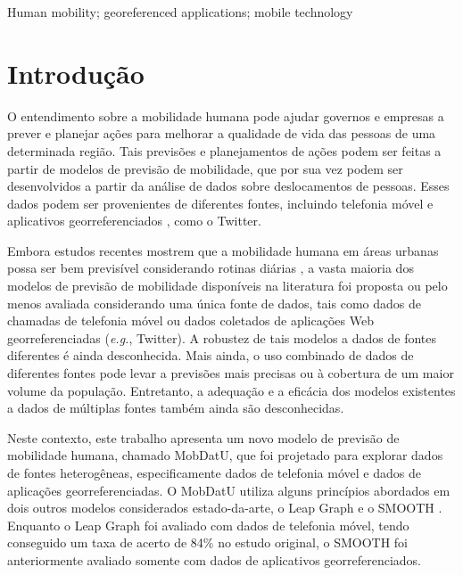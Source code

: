 \documentclass[10pt, a4paper, onecolumn, conference, compsocconf]{IEEEtran}
\begin{document}
\begin{IEEEkeywords}
Human mobility; georeferenced applications; mobile technology
\end{IEEEkeywords}


%
\IEEEpeerreviewmaketitle


\section{Introdução}

O entendimento sobre a mobilidade humana pode ajudar governos e empresas a prever e planejar ações  para melhorar a qualidade de vida das pessoas de uma determinada região. Tais previsões e planejamentos de ações podem ser feitas a partir de modelos de previsão de mobilidade, que por sua vez podem ser desenvolvidos a partir da análise de dados sobre deslocamentos de pessoas. Esses dados podem ser provenientes de diferentes fontes, incluindo telefonia móvel \cite{barabasi2008} e aplicativos georreferenciados \cite{noulas2011}, como o Twitter.

Embora estudos recentes mostrem que a mobilidade humana em áreas urbanas possa ser bem previsível considerando rotinas diárias \cite{barabasi201002}, a vasta maioria dos modelos de previsão de mobilidade disponíveis na literatura \cite{Munjal2011, Dong2013, Kyunghan2012,allamanis2012} foi proposta ou pelo menos avaliada considerando uma única fonte de dados, tais como dados de chamadas de telefonia móvel ou dados coletados de aplicações Web georreferenciadas (\textit{e.g.}, Twitter). A robustez de tais modelos a dados de fontes diferentes é ainda desconhecida.   Mais ainda, o uso combinado de dados de diferentes fontes pode levar a previsões mais precisas ou à  cobertura de um maior volume da população. Entretanto,  a adequação e a eficácia dos modelos existentes a dados de múltiplas fontes também ainda são desconhecidas. 

Neste contexto, este trabalho apresenta um novo modelo de previsão de mobilidade humana, chamado MobDatU, que foi projetado para explorar dados de fontes heterogêneas, especificamente dados de telefonia móvel e dados de aplicações georreferenciadas. O MobDatU utiliza alguns princípios abordados em dois outros modelos considerados estado-da-arte, o Leap Graph \cite{Dong2013} e o SMOOTH \cite{Munjal2011}. Enquanto o Leap Graph foi avaliado com dados de telefonia móvel, tendo conseguido um taxa de acerto de 84\%  no estudo original, o SMOOTH foi anteriormente avaliado somente com dados de aplicativos georreferenciados. 
\end{document}
